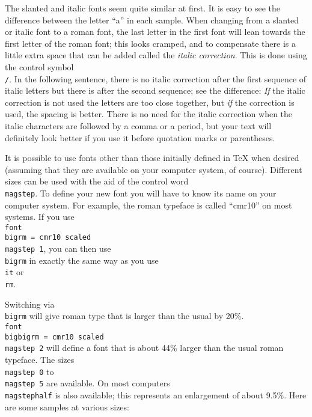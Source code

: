 The slanted and italic fonts seem quite similar at first.  It is 
easy to see the difference between the letter ``a'' in each 
sample. When changing from a slanted or italic font to a roman 
font, the last letter in the first font will lean towards the 
first letter of the roman font; this looks cramped, and to 
compensate there is a little extra space that can be added called 
the {\sl italic correction}. This is done using the control 
symbol {\tt \\/}. 
\toindex{/} 
In the following sentence, there is no italic correction after 
the first sequence of italic letters but there is after the 
second sequence; see the difference: {\it If} the italic 
correction is not used the letters are too close together, but 
{\it if\/} the correction is used, the spacing is better.  There 
is no need for the italic correction when the italic characters 
are followed by a comma or a period, but your text will 
definitely look better if you use it before quotation marks or 
parentheses. 
 
 
It is possible to use fonts other than those initially defined in 
\TeX{} when desired (assuming that they are available on 
your computer system, of course).  Different sizes can be used 
with the aid of the control word {\tt \\magstep}. To define your 
new font you will have to know its name on your computer system. 
For example, the roman typeface is called ``cmr10'' on most 
systems.  If you use {\tt \\font\\bigrm = cmr10 scaled \\magstep 
1}, you can then use {\tt\\bigrm} in exactly the same way as you 
use {\tt\\it} or {\tt\\rm}. 
 
Switching via {\tt\\bigrm} will give roman type that is larger 
than the usual by 20\%\null.  {\tt \\font\\bigbigrm = cmr10 
scaled \\magstep 2} will define a font that is about 44\% larger 
than the usual roman typeface.  The sizes {\tt \\magstep~0} to 
{\tt \\magstep~5} are available.  On most computers {\tt \\magstephalf} 
is also available; this represents an enlargement of 
about 9.5\%\null. Here are some samples at various sizes: 
 
